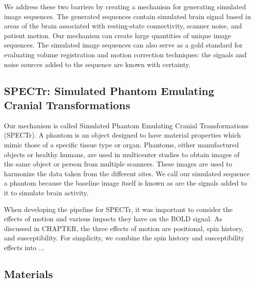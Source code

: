 We address these two barriers by creating a mechanism for generating simulated image sequences. The generated sequences contain simulated brain signal based in areas of the brain associated with resting-state connectivity, scanner noise, and patient motion. Our mechanism can create large quantities of unique image sequences. The simulated image sequences can also serve as a gold standard for evaluating volume registration and motion correction techniques: the signals and noise sources added to the sequence are known with certainty.


\subsection{SPECTr: Simulated Phantom Emulating Cranial Transformations}

Our mechanism is called Simulated Phantom Emulating Cranial Transformations (SPECTr). A phantom is an object designed to have material properties which mimic those of a specific tissue type or organ. Phantoms, either manufactured objects or healthy humans, are used in multicenter studies to obtain images of the same object or person from multiple scanners. These images are used to harmonize the data taken from the different sites. We call our simulated sequence a phantom because the baseline image itself is known as are the signals added to it to simulate brain activity. 

When developing the pipeline for SPECTr, it was important to consider the effects of motion and various impacts they have on the BOLD signal. As discussed in CHAPTER, the three effects of motion are positional, spin history, and susceptibility. For simplicity, we combine the spin history and susceptibility effects into ...

\subsection{Materials}

